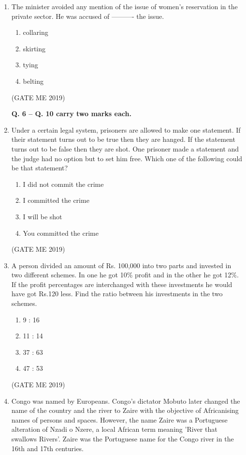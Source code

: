 \documentclass[journal]{IEEEtran}
\begin{document}
\begin{enumerate}
\item The minister avoided any mention of the issue of women's reservation in the private sector. He was accused of ---------- the issue.
\begin{multicols}{2}
\begin{enumerate}
    \item collaring
    \item skirting
    \item tying
    \item belting
\end{enumerate}
\end{multicols}
\hfill (GATE ME 2019)

\textbf{Q. 6 – Q. 10 carry two marks each.}

\item Under a certain legal system, prisoners are allowed to make one statement. If their statement turns out to be true then they are hanged. If the statement turns out to be false then they are shot. One prisoner made a statement and the judge had no option but to set him free. Which one of the following could be that statement?
\begin{enumerate}
    \item I did not commit the crime
    \item I committed the crime
    \item I will be shot
    \item You committed the crime
\end{enumerate}
\hfill (GATE ME 2019)

\item A person divided an amount of Rs. 100,000 into two parts and invested in two different schemes. In one he got 10\% profit and in the other he got 12\%. If the profit percentages are interchanged with these investments he would have got Rs.120 less. Find the ratio between his investments in the two schemes.
\begin{multicols}{4}
\begin{enumerate}
    \item 9 : 16
    \item 11 : 14
    \item 37 : 63
    \item 47 : 53
\end{enumerate}
\end{multicols}
\hfill (GATE ME 2019)

\item Congo was named by Europeans. Congo's dictator Mobuto later changed the name of the country and the river to Zaire with the objective of Africanising names of persons and spaces. However, the name Zaire was a Portuguese alteration of Nzadi o Nzere, a local African term meaning 'River that swallows Rivers'. Zaire was the Portuguese name for the Congo river in the 16th and 17th centuries.


\end{enumerate}
\end{document}
